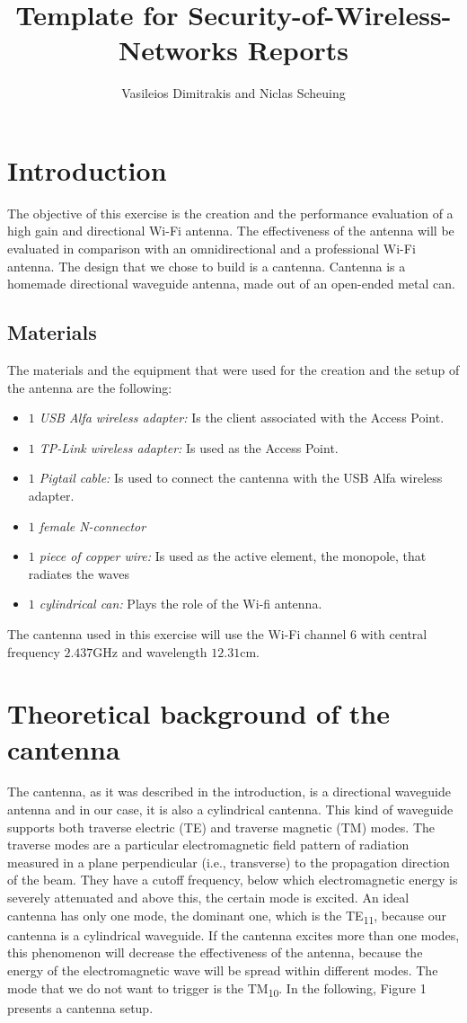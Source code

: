 \documentclass[12pt,a4paper]{article}
\title{Template for Security-of-Wireless-Networks Reports}
\author{Vasileios Dimitrakis and Niclas Scheuing}
\begin{document}
\maketitle

\section{Introduction}
The objective of this exercise is the creation and the performance evaluation of a high gain
and directional Wi-Fi antenna. The effectiveness of the antenna will be evaluated in comparison with an omnidirectional and a professional Wi-Fi antenna. The design that we chose to build is a cantenna. Cantenna is a homemade directional waveguide antenna, made out of an open-ended metal can.
\subsection{Materials}
The materials and the equipment that were used for the creation and the setup of the antenna are the following: 
\begin{itemize}
\item {\emph{$1$ USB Alfa wireless adapter:} Is the client associated with the Access Point.} 
\item {\emph{$1$ TP-Link wireless adapter:} Is used as the Access Point.}
\item {\emph{$1$ Pigtail cable:} Is used to connect the cantenna with the USB Alfa wireless adapter.}
\item {\emph{$1$ female N-connector}}
\item {\emph{$1$ piece of copper wire:} Is used as the active element, the monopole, that radiates the waves}
\item {\emph{$1$ cylindrical can:} Plays the role of the Wi-fi antenna.} 
\end{itemize}
The cantenna used in this exercise will use the Wi-Fi channel $6$ with central frequency $2.437$GHz and wavelength $12.31$cm.

\section{Theoretical background of the cantenna}
The cantenna, as it was described in the introduction, is a directional waveguide antenna and in our case, it is also a cylindrical cantenna. This kind of waveguide supports both traverse electric (TE) and traverse magnetic (TM) modes. The traverse modes are a particular electromagnetic field pattern of radiation measured in a plane perpendicular (i.e., transverse) to the propagation direction of the beam. They have a cutoff frequency, below which electromagnetic energy is severely attenuated and above this, the certain mode is excited. An ideal cantenna has only one mode, the dominant one, which is the TE\textsubscript{11}, because our cantenna is a cylindrical waveguide. If the cantenna excites more than one modes, this phenomenon will decrease the effectiveness of the antenna, because the energy of the electromagnetic wave will be spread within different modes. The mode that we do not want to trigger is the TM\textsubscript{10}. In the following, Figure 1 presents a cantenna setup.
\end{document}
